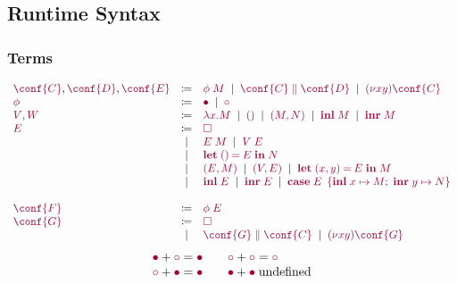 \documentclass[main.tex]{subfiles}
\begin{document}
\subsection{Runtime Syntax}%
\label{sec:pgv-syntax-runtime}

\subsubsection{Terms}
\[
\begin{array}[t]{lcl}
  \tm{\conf{C}}, \tm{\conf{D}}, \tm{\conf{E}}
  & \coloneqq & \tm{\phi\;M}
    \sep        \tm{\ppar{\conf{C}}{\conf{D}}}
    \sep        \tm{\res{x}{y}{\conf{C}}}
  \\
  \tm{\phi}
  & \coloneqq & \tm{\main}
    \sep        \tm{\child}
  \\
  \tm{V}, \tm{W}
  & \coloneqq & \tm{\lambda x.M}
    \sep        \tm{\unit}
    \sep        \tm{\pair{M}{N}}
    \sep        \tm{\inl{M}}
    \sep        \tm{\inr{M}}
  \\
  \tm{E}
  & \coloneqq & \tm{\hole} \\
  & \sep      & \tm{E\;M}
    \sep        \tm{V\;E} \\
  & \sep      & \tm{\letunit{E}{N}} \\
  & \sep      & \tm{\pair{E}{M}}
    \sep        \tm{\pair{V}{E}}
    \sep        \tm{\letpair{x}{y}{E}{M}} \\
  & \sep      & \tm{\inl{E}}
    \sep        \tm{\inr{E}}
    \sep        \tm{\casesum{E}{x}{M}{y}{N}} \\
  \\
  \tm{\conf{F}}
  & \coloneqq & \tm{\phi\;E}
  \\
  \tm{\conf{G}}
  & \coloneqq & \tm{\hole} \\
  & \sep      & \tm{\ppar{\conf{G}}{\conf{C}}}
    \sep        \tm{\res{x}{y}{\conf{G}}}
\end{array}
\]
\[
\begin{array}{ll}
  \tm{\main}  + \tm{\child} = \tm{\main}
  \\
  \tm{\child} + \tm{\main}  = \tm{\main}
\end{array}
\quad
\begin{array}{ll}
  \tm{\child} + \tm{\child} = \tm{\child}
  \\
  \tm{\main}  + \tm{\main} \; \text{undefined}
\end{array}
\]
\end{document}

